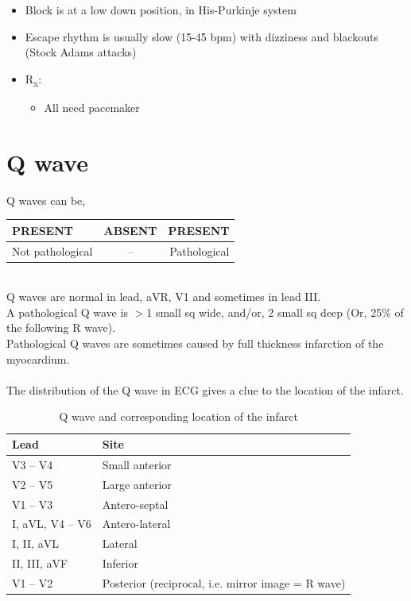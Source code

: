 \documentclass[11pt,a4paper]{report}
\begin{document}
\begin{enumerate}
\begin{enumerate}
\begin{enumerate}
\begin{itemize}
				\item Block is at a low down position, in His-Purkinje system 
				\item Escape rhythm is usually slow (15-45 bpm) with dizziness and blackouts (Stock Adams attacks)
				\item R\textsubscript{x}:
				\begin{itemize}
					\item All need pacemaker 
				\end{itemize}
			\end{itemize}
		\end{enumerate}
	\end{enumerate}
\end{enumerate}


\section{Q wave}
Q waves can be, 
\begin{center}
	\begin{tabular}{l|c|r} 
		\toprule[1.5pt]
		PRESENT					& ABSENT				& PRESENT \\ 
		\midrule
		Not pathological & -- & Pathological\\ 
		\bottomrule[1.5pt]
	\end{tabular}
\end{center}

~\\
\noindent Q waves are normal in lead, aVR, V1 and sometimes in lead III. \\
A pathological Q wave is $>$1 small sq wide, and/or, 2 small sq deep (Or, 25\% of the following R wave).\\
Pathological Q waves are sometimes caused by full thickness infarction of the myocardium. \\ \\
The distribution of the Q wave in ECG gives a clue to the location of the infarct. 
\begin{table}[ht]
	\centering
	\caption[Q wave and infarct location]{Q wave and corresponding location of the infarct}
	\begin{tabular}{l|l} 
		\toprule[1.5pt]
		\textbf{Lead}		& \textbf{Site} \\ 
		\midrule
		V3 -- V4 	& Small anterior \\
		V2 -- V5	& Large anterior \\
		V1 -- V3 	& Antero-septal \\
		I, aVL, V4 -- V6	& Antero-lateral \\
		I, II, aVL			& Lateral \\
		II, III, aVF		& Inferior \\
		V1 -- V2 			& Posterior (reciprocal, i.e. mirror image = R wave)\\
		\bottomrule[1.5pt]
	\end{tabular}
	\begin{flushleft} 
	\end{flushleft}
	\label{Systolic BP}
\end{table}
\end{document}
